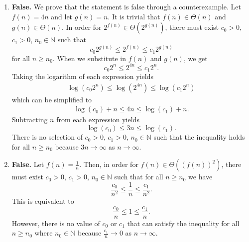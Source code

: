 \documentclass[11pt, letterpaper, titlepage]{article}
\begin{document}
\begin{enumerate}[label=\alph*)]
    \item \textbf{False.} We prove that the statement is false through a counterexample. Let $f(n) = 4n$ and let $g(n) = n$. It is trivial that $f(n) \in \Theta(n)$ and $g(n) \in \Theta(n)$. In order for $2^{f(n)} \in \Theta(2^{g(n)})$, there must exist $c_0 > 0$, $c_1 > 0$, $n_0 \in \mathbb{N}$ such that
    \begin{equation}
        c_0 2^{g(n)} \leq 2^{f(n)} \leq c_1 2^{g(n)}
    \end{equation}
    for all $n \geq n_0$. When we substitute in $f(n)$ and $g(n)$, we get 
    \begin{equation}
        c_0 2^{n} \leq 2^{4n} \leq c_1 2^{n}.
    \end{equation}
    Taking the logarithm of each expression yields 
    \begin{align}
        \log(c_0 2^{n}) \leq \log(2^{4n}) \leq \log(c_1 2^{n})
    \end{align}
    which can be simplified to
    \begin{align}
        \log(c_0) + n \leq 4n \leq \log(c_1) + n.
    \end{align}
    Subtracting $n$ from each expression yields 
    \begin{equation}
        \log(c_0) \leq 3n \leq \log(c_1).
    \end{equation}
    There is no selection of $c_0 > 0$, $c_1 > 0$, $n_0 \in \mathbb{N}$ such that the inequality holds for all $n \geq n_0$ because $3n \to \infty$ as $n \to \infty$.
    
    \item \textbf{False.} Let $f(n) = \frac{1}{n}$. Then, in order for $f(n) \in \Theta((f(n))^2)$, there must exist $c_0 > 0$, $c_1 > 0$, $n_0 \in \mathbb{N}$ such that for all $n \geq n_0$ we have 
    \begin{equation}
        \frac{c_0}{n^2} \leq \frac{1}{n} \leq \frac{c_1}{n^2}.
    \end{equation}
    This is equivalent to 
    \begin{equation}
        \frac{c_0}{n} \leq 1 \leq \frac{c_1}{n}.
    \end{equation}
    However, there is no value of $c_0$ or $c_1$ that can satisfy the inequality for all $n \geq n_0$ where $n_0 \in \mathbb{N}$ because $\frac{c_1}{n} \to 0$ as $n \to \infty$.
\end{enumerate}

\newpage
\end{document}
